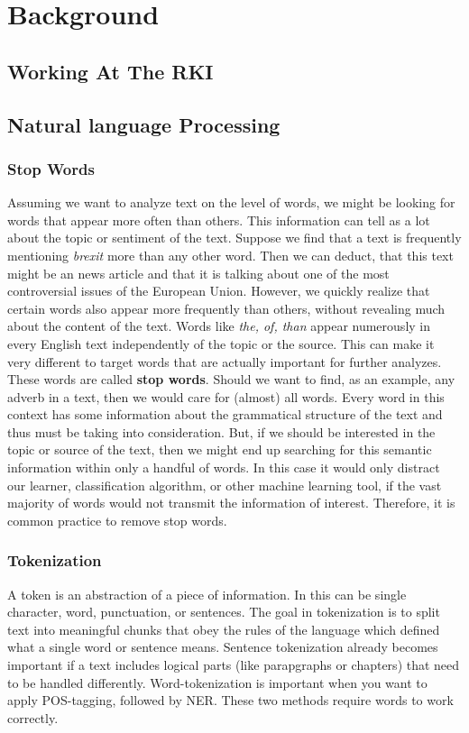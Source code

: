 \chapter{Background}

\section{Working At The RKI}

\section{Natural language Processing}


\subsection{Stop Words}
Assuming we want to analyze text on the level of words, we might be looking for
words that appear more often than others. This information can tell as a lot about
the topic or sentiment of the text. Suppose we find that a text is frequently
mentioning \textit{brexit} more than any other word. Then we can deduct, that this text might
be an news article and that it is talking about one of the most controversial issues
of the European Union. However, we quickly realize that certain words
also appear more frequently than others, without revealing much about the content
of the text. Words like \textit{the, of, than} appear numerously in every English
text independently of the topic or the source. This can make it very different to target
words that are actually important for further analyzes. These words are called \textbf{stop words}. 
Should we want to find, as an example, any adverb in a text, then we would care for (almost) all words.
Every word in this context has some information about the grammatical structure of the text
and thus must be taking into consideration. But, if we should be interested in the topic
or source of the text, then we might end up searching for this semantic information within only a handful of words.
In this case it would only distract our learner, classification algorithm, or other machine
learning tool, if the vast majority of words would not transmit the information
of interest. Therefore, it is common practice to remove stop words.


\subsection{Tokenization}
A token is an abstraction of a piece of information. In  this can be
single character, word, punctuation, or sentences. The goal in tokenization is
to split text into meaningful chunks that obey the rules of the language which defined
what a single word or sentence means.
Sentence tokenization already becomes important if a text
includes logical parts (like parapgraphs or chapters) that need to be handled differently.
Word-tokenization is important when you want to apply POS-tagging, followed by NER.
These two methods require words to work correctly.


